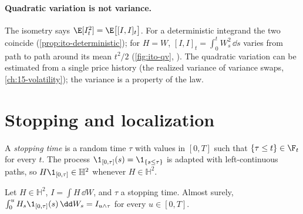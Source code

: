 \paragraph{Quadratic variation is not variance.} The isometry says
$\E[I_t^2]=\E\big[[I,I]_t\big]$. For a deterministic integrand the two coincide
(\cref{prop:ito-deterministic}); for $H=W$, $[I,I]_t=\int_0^tW_s^2\,\dd s$ varies from path to
path around its mean $t^2/2$ (\cref{fig:ito-qv}, ). The quadratic
variation can be estimated from a single price history (the realized variance of variance
swaps, \cref{ch:15-volatility}); the variance is a property of the law.


\section{Stopping and localization}\label{sec:ito-local}

A \emph{stopping time} is a random time $\tau$ with values in $[0,T]$ such that
$\{\tau\le t\}\in\F_t$ for every $t$. The process $\1_{[0,\tau]}(s)=\1_{\{s\le\tau\}}$ is adapted
with left-continuous paths, so $H\1_{[0,\tau]}\in\mathbb H^2$ whenever $H\in\mathbb H^2$.

\begin{proposition}\label{prop:ito-stopping}
Let $H\in\mathbb H^2$, $I=\int H\,\dd W$, and $\tau$ a stopping time. Almost surely,
$\int_0^uH_s\1_{[0,\tau]}(s)\,\dd W_s=I_{u\wedge\tau}$ for every $u\in[0,T]$.
\end{proposition}

